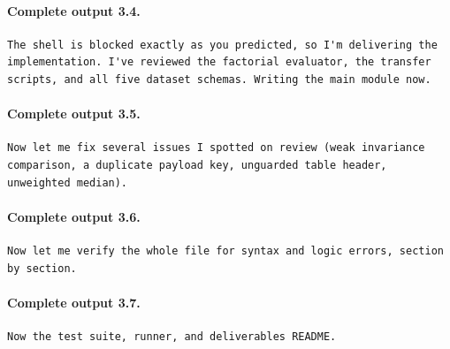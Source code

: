 \documentclass[UTF8,10pt]{ctexart}
\begin{document}
\paragraph{Complete output 3.4.}
\begin{Verbatim}[breaklines=true,breakanywhere=true,fontsize=\scriptsize,frame=single,framesep=2pt]
The shell is blocked exactly as you predicted, so I'm delivering the implementation. I've reviewed the factorial evaluator, the transfer scripts, and all five dataset schemas. Writing the main module now.
\end{Verbatim}

\paragraph{Complete output 3.5.}
\begin{Verbatim}[breaklines=true,breakanywhere=true,fontsize=\scriptsize,frame=single,framesep=2pt]
Now let me fix several issues I spotted on review (weak invariance comparison, a duplicate payload key, unguarded table header, unweighted median).
\end{Verbatim}

\paragraph{Complete output 3.6.}
\begin{Verbatim}[breaklines=true,breakanywhere=true,fontsize=\scriptsize,frame=single,framesep=2pt]
Now let me verify the whole file for syntax and logic errors, section by section.
\end{Verbatim}

\paragraph{Complete output 3.7.}
\begin{Verbatim}[breaklines=true,breakanywhere=true,fontsize=\scriptsize,frame=single,framesep=2pt]
Now the test suite, runner, and deliverables README.
\end{Verbatim}
\end{document}
